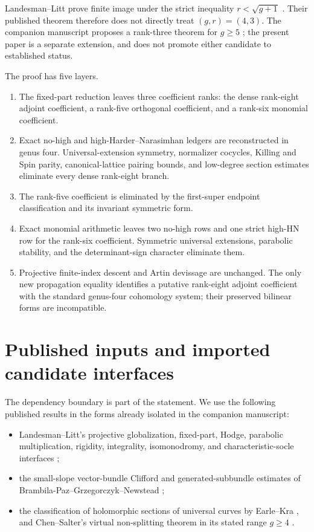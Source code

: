 \documentclass[11pt]{article}
\theoremstyle{definition}
\begin{document}
Landesman--Litt prove finite image under the strict inequality
$r<\sqrt{g+1}$ \cite[Theorem~1.2.1]{LLCan}.  Their published theorem therefore
does not directly treat $(g,r)=(4,3)$.  The companion manuscript proposes a
rank-three theorem for $g\ge5$ \cite{SneidermanG5}; the present paper is a
separate extension, and does not promote either candidate to established
status.

The proof has five layers.
\begin{enumerate}[label=\textup{(\arabic*)}]
\item The fixed-part reduction leaves three coefficient ranks: the dense
rank-eight adjoint coefficient, a rank-five orthogonal coefficient, and a
rank-six monomial coefficient.
\item Exact no-high and high-Harder--Narasimhan ledgers are reconstructed in
genus four.  Universal-extension symmetry, normalizer cocycles, Killing and
Spin parity, canonical-lattice pairing bounds, and low-degree section
estimates eliminate every dense rank-eight branch.
\item The rank-five coefficient is eliminated by the first-super endpoint
classification and its invariant symmetric form.
\item Exact monomial arithmetic leaves two no-high rows and one strict
high-HN row for the rank-six coefficient.  Symmetric universal extensions,
parabolic stability, and the determinant-sign character eliminate them.
\item Projective finite-index descent and Artin devissage are unchanged.
The only new propagation equality identifies a putative rank-eight adjoint
coefficient with the standard genus-four cohomology system; their preserved
bilinear forms are incompatible.
\end{enumerate}

\section{Published inputs and imported candidate interfaces}
\label{sec:interfaces}

The dependency boundary is part of the statement.  We use the following
published results in the forms already isolated in the companion manuscript:
\begin{itemize}
\item Landesman--Litt's projective globalization, fixed-part, Hodge,
parabolic multiplication, rigidity, integrality, isomonodromy, and
characteristic-socle interfaces \cite{LLCan,LLGeo};
\item the small-slope vector-bundle Clifford and generated-subbundle
estimates of Brambila-Paz--Grzegorczyk--Newstead \cite{BPGN};
\item the classification of holomorphic sections of universal curves by
Earle--Kra \cite{EarleKra}, and Chen--Salter's virtual non-splitting theorem
in its stated range $g\ge4$ \cite{ChenSalter}.
\end{itemize}
\end{document}
